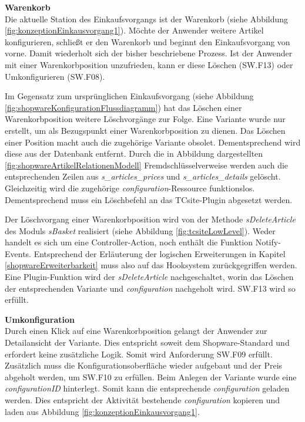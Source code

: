 \documentclass[11pt, a4paper, titlepage, listof=totoc, bibliography=totoc, index=totoc, twoside, openright, headings=normal, draft]{scrreprt}
\begin{document}
\textbf{Warenkorb}\\
Die aktuelle Station des Einkaufsvorgangs ist der Warenkorb (siehe Abbildung \ref{fig:konzeptionEinkausvorgang1}). Möchte der Anwender weitere Artikel konfigurieren, schließt er den Warenkorb und beginnt den Einkaufsvorgang von vorne. Damit wiederholt sich der bisher beschriebene Prozess. Ist der Anwender mit einer Warenkorbposition unzufrieden, kann er diese Löschen (SW.F13) oder Umkonfigurieren (SW.F08).

Im Gegensatz zum ursprünglichen Einkaufsvorgang (siehe Abbildung \ref{fig:shopwareKonfigurationFlussdiagramm}) hat das Löschen einer Warenkorbposition weitere Löschvorgänge zur Folge. Eine Variante wurde nur erstellt, um als Bezugspunkt einer Warenkorbposition zu dienen. Das Löschen einer Position macht auch die zugehörige Variante obsolet. Dementsprechend wird diese aus der Datenbank entfernt. Durch die in Abbildung dargestellten \ref{fig:shopwareArtikelRelationenModell} Fremdschlüsselverweise werden auch die entsprechenden Zeilen aus \emph{s\_articles\_prices} und \emph{s\_articles\_details}  gelöscht. Gleichzeitig wird die zugehörige \emph{configuration}-Ressource funktionslos. Dementsprechend muss ein Löschbefehl an das TCsite-Plugin abgesetzt werden.

Der Löschvorgang einer Warenkorbposition wird von der Methode \emph{sDeleteArticle} des Moduls \emph{sBasket} realisiert (siehe Abbildung \ref{fig:tcsiteLowLevel}). Weder handelt es sich um eine Controller-Action, noch enthält die Funktion Notify-Events. Entsprechend der Erläuterung der logischen Erweiterungen in Kapitel \ref{shopwareErweiterbarkeit} muss also auf das Hooksystem zurückgegriffen werden. Eine Plugin-Funktion wird der \emph{sDeleteArticle} nachgeschaltet, worin das Löschen der entsprechenden Variante und \emph{configuration} nachgeholt wird. SW.F13 wird so erfüllt.

\textbf{Umkonfiguration}\\
Durch einen Klick auf eine Warenkorbposition gelangt der Anwender zur Detailansicht der Variante. Dies entspricht soweit dem Shopware-Standard und erfordert keine zusätzliche Logik. Somit wird Anforderung SW.F09 erfüllt. Zusätzlich muss die Konfigurationsoberfläche wieder aufgebaut und der Preis abgeholt werden, um SW.F10 zu erfüllen. Beim Anlegen der Variante wurde eine \emph{configurationID} hinterlegt. Somit kann die entsprechende \emph{configuration} geladen werden. Dies entspricht der Aktivität \glqq bestehende \emph{configuration} kopieren und laden\grqq{} aus Abbildung \ref{fig:konzeptionEinkausvorgang1}.
\end{document}
